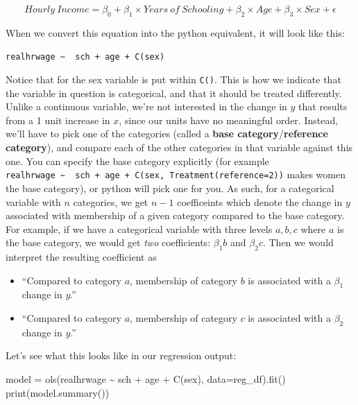 \documentclass[
  letterpaper,
  DIV=11,
  numbers=noendperiod]{scrreprt}
\newenvironment{Shaded}{\begin{snugshade}}{\end{snugshade}}
\newcommand{\BuiltInTok}[1]{\textcolor[rgb]{0.00,0.23,0.31}{#1}}
\newcommand{\NormalTok}[1]{\textcolor[rgb]{0.00,0.23,0.31}{#1}}
\newcommand{\OperatorTok}[1]{\textcolor[rgb]{0.37,0.37,0.37}{#1}}
\newcommand{\StringTok}[1]{\textcolor[rgb]{0.13,0.47,0.30}{#1}}
\providecommand{\tightlist}{%
  \setlength{\itemsep}{0pt}\setlength{\parskip}{0pt}}\usepackage{longtable,booktabs,array}
\begin{document}
\[Hourly\ Income= \beta_0 + \beta_1 \times Years\ of\ Schooling + \beta_2 \times Age + \beta_3 \times Sex +\epsilon \]

When we convert this equation into the python equivalent, it will look
like this:

\texttt{realhrwage\ \textasciitilde{}\ \ sch\ +\ age\ +\ C(sex)}

Notice that for the sex variable is put within \texttt{C()}. This is how
we indicate that the variable in question is categorical, and that it
should be treated differently. Unlike a continuous variable, we're not
interested in the change in \(y\) that results from a 1 unit increase in
\(x\), since our units have no meaningful order. Instead, we'll have to
pick one of the categories (called a \textbf{base
category}/\textbf{reference category}), and compare each of the other
categories in that variable against this one. You can specify the base
category explicitly (for example
\texttt{realhrwage\ \textasciitilde{}\ \ sch\ +\ age\ +\ C(sex,\ Treatment(reference=2))}
makes women the base category), or python will pick one for you. As
such, for a categorical variable with \(n\) categories, we get \(n-1\)
coefficeints which denote the change in \(y\) associated with membership
of a given category compared to the base category. For example, if we
have a categorical variable with three levels \(a, b, c\) where \(a\) is
the base category, we would get \emph{two} coefficients: \(\beta_1 b\)
and \(\beta_2 c\). Then we would interpret the resulting coefficient as

\begin{itemize}
\tightlist
\item
  ``Compared to category \(a\), membership of category \(b\) is
  associated with a \(\beta_1\) change in \(y\).''
\item
  ``Compared to category \(a\), membership of category \(c\) is
  associated with a \(\beta_2\) change in \(y\).''
\end{itemize}

Let's see what this looks like in our regression output:

\begin{Shaded}
\begin{Highlighting}[]
\NormalTok{model }\OperatorTok{=}\NormalTok{ ols(}\StringTok{\textquotesingle{}realhrwage \textasciitilde{}  sch + age + C(sex)\textquotesingle{}}\NormalTok{, data}\OperatorTok{=}\NormalTok{reg\_df).fit() }
\BuiltInTok{print}\NormalTok{(model.summary())}
\end{Highlighting}
\end{Shaded}
\end{document}
